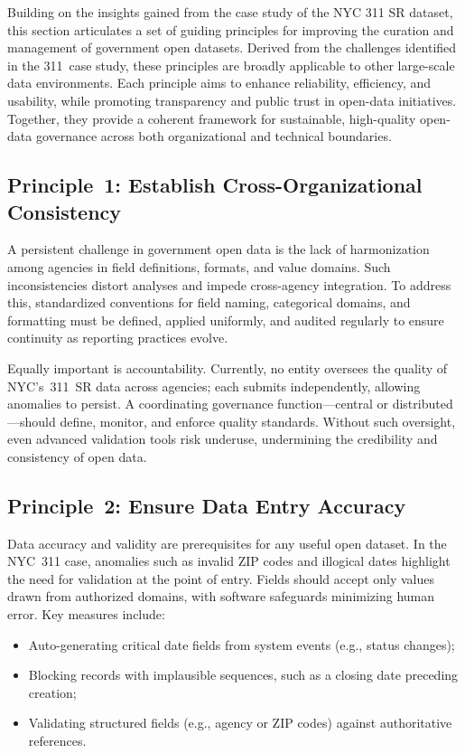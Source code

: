 \documentclass[linenumber]{jdsart}
\begin{document}
Building on the insights gained from the case study of the 
\textsc{NYC 311 SR} dataset, this section articulates a set 
of guiding principles for improving the curation and management of 
government open datasets. 
Derived from the challenges identified in the 311~case study, 
these principles are broadly applicable to other large-scale data 
environments. 
Each principle aims to enhance reliability, efficiency, and usability, 
while promoting transparency and public trust in open-data initiatives. 
Together, they provide a coherent framework for sustainable, 
high-quality open-data governance across both organizational 
and technical boundaries.

\subsection{Principle~1: Establish Cross-Organizational Consistency}
\label{subsec:principle1}

A persistent challenge in government open data is the lack of harmonization 
among agencies in field definitions, formats, and value domains.  
Such inconsistencies distort analyses and impede cross-agency integration.  
To address this, standardized conventions for field naming, categorical 
domains, and formatting must be defined, applied uniformly, and audited 
regularly to ensure continuity as reporting practices evolve.

Equally important is accountability.  
Currently, no entity oversees the quality of NYC’s~311~\textsc{SR} data across 
agencies; each submits independently, allowing anomalies to persist.  
A coordinating governance function—central or distributed—should define, 
monitor, and enforce quality standards.  
Without such oversight, even advanced validation tools risk underuse, 
undermining the credibility and consistency of open data.


\subsection{Principle~2: Ensure Data Entry Accuracy}
\label{subsec:principle2}
Data accuracy and validity are prerequisites for any useful open dataset.  
In the \textsc{NYC~311} case, anomalies such as invalid ZIP codes and 
illogical dates highlight the need for validation at the point of entry.  
Fields should accept only values drawn from authorized domains, with 
software safeguards minimizing human error.  
Key measures include:

\begin{itemize}[left=1.5em]
  \item Auto-generating critical date fields from system events (e.g., status changes);  
  \item Blocking records with implausible sequences, such as a closing date preceding creation;  
  \item Validating structured fields (e.g., agency or ZIP codes) against authoritative references.  
\end{itemize}
\end{document}

